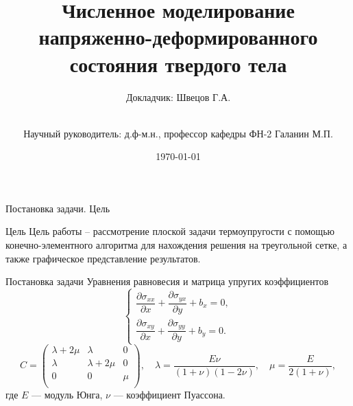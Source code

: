 \documentclass{beamer}
\title[Численное моделирование ...]{Численное моделирование напряженно-деформированного состояния твердого тела}
\author[Швецов Г.А.]{Докладчик: Швецов Г.А.\and\\[0.5mm] Научный руководитель: д.ф-м.н., профессор кафедры ФН-2 Галанин М.П.}
\institute[каф. Прикладная математика ФН-2]{группа ФН2-62Б}
\date{\today}
\begin{document}
	\newcommand{\pl}{\partial}
	\begin{frame}
		\titlepage
	\end{frame}
	
	\begin{frame}{Постановка задачи. Цель}
		\begin{block}{Цель}
			Цель работы -- рассмотрение плоской задачи термоупругости с помощью конечно-элементного алгоритма для нахождения решения на треугольной сетке, а также графическое представление результатов.
		\end{block}
		\begin{block}{Постановка задачи}
			\footnotesize
			Уравнения равновесия и матрица упругих коэффициентов
				\[
				\begin{cases}
				\dfrac{\pl\sigma_{xx}}{\pl x}+\dfrac{\pl\sigma_{yx}}{\pl y} + b_x = 0,\\
				\dfrac{\pl\sigma_{xy}}{\pl x}+\dfrac{\pl\sigma_{yy}}{\pl y} + b_y =0.						
				\end{cases}
				\]
				\[
				C=
				\begin{pmatrix}
					\lambda + 2\mu & \lambda &  0 \\
					\lambda & \lambda + 2\mu & 0 \\
					0 &      0 &       \mu \\
				\end{pmatrix}, \quad\lambda = \frac{E\nu}{(1+\nu)(1-2\nu)},\quad\mu=\frac{E}{2(1+\nu)},	
				\]
				где $E$ --- модуль Юнга, $\nu$ --- коэффициент Пуассона.
		\end{block}
	\end{frame}
\end{document}
